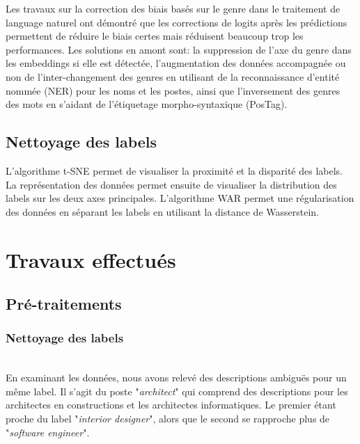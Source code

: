 Les travaux sur la correction des biais basés sur le genre dans le traitement de language naturel  ont démontré que les corrections de logits après les prédictions permettent de réduire le biais certes mais réduisent beaucoup trop les performances. Les solutions en amont sont: la suppression de l'axe du genre dans les embeddings  si elle est détectée, l'augmentation des données  accompagnée ou non de l'inter-changement des genres en utilisant de la reconnaissance d'entité nommée (NER) pour les noms et les postes, ainsi que l'inversement des genres des mots en s'aidant de l'étiquetage morpho-syntaxique (PosTag).

\subsection{Nettoyage des labels}
L'algorithme t-SNE  permet de visualiser la proximité et la disparité des labels. La représentation des données permet ensuite de visualiser la distribution des labels sur les deux axes principales. L'algorithme WAR  permet une régularisation des données en séparant les labels en utilisant la distance de Wasserstein.


\section{Travaux effectués}
\subsection{Pré-traitements}
\subsubsection{Nettoyage des labels}
\hfill\\
En examinant les données, nous avons relevé des descriptions ambiguës pour un même label. Il s'agit du poste "\textit{architect}" qui comprend des descriptions pour les architectes en constructions et les architectes informatiques. Le premier étant proche du label "\textit{interior designer}", alors que le second se rapproche plus de "\textit{software engineer}".


